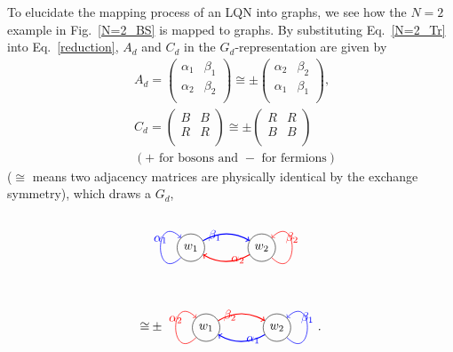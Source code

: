 \documentclass[a4paper,twocolumn,8pt,accepted=2021-12-15]{quantumarticle}
\newcommand{\nn}{\nonumber}
\def\a{\alpha}
\def\b{\beta}
\begin{document}
	To elucidate the mapping process of an LQN into graphs, we see how the $N=2$ example in Fig.~\ref{N=2_BS} is mapped to graphs. By substituting Eq.~\eqref{N=2_Tr} into Eq.~\eqref{reduction}, $A_{d}$ and $C_d$ in the $G_d$-representation are given by
	\begin{align}
		&A_d= \begin{pmatrix}
			\a_1 & \b_1 \\
			\a_2 & \b_{2} \\
		\end{pmatrix}\cong \pm \begin{pmatrix}
			\a_2 & \b_2\\
			\a_1 & \b_{1} \\
		\end{pmatrix}
		,\nn \\
		&C_d = 
		\begin{pmatrix}
			B & B \\
			R & R \\
		\end{pmatrix}
		\cong  \pm \begin{pmatrix}
			R & R \\
			B & B \\
		\end{pmatrix} \nn\\
		& (\textrm{$+$ for bosons and $-$ for fermions})
	\end{align} ($\cong$ means two adjacency matrices are physically identical by the exchange symmetry),    
	which draws a $G_d$,
	\begin{align}
		&\begin{tikzpicture}[baseline={([yshift=-.5ex]current bounding box.center)}]
			\node[circle,draw,minimum size=0.5cm] (XX) at (0,0) {$w_1$};
			\node[circle,draw,minimum size=0.5cm] (YY) at (2,0) {$w_2$};
			\path[every loop/.style={min distance=10mm,in=135,out=225,looseness=5},line width = 0.5pt,->,color=blue] (XX) edge [loop above] node {$\a_1$} (XX);
			\path[every loop/.style={min distance=10mm,in=45,out=-45,looseness=5},line width = 0.5pt,->,color=red] (YY) edge [loop above] node{$\b_2$} (YY);		
			\path[line width = 0.8pt, ->,color=blue] (XX) edge[bend left]   node[ near start] {$\b_1$ } (YY);
			\path[line width = 0.8pt,color=red, -> ] (YY) edge[bend left]  node[near start] {$\a_2$ } (XX);
		\end{tikzpicture}
		\nn \\
		\cong &\pm 
		\begin{tikzpicture}[baseline={([yshift=-.5ex]current bounding box.center)}]
			\node[circle,draw,minimum size=0.5cm] (XX) at (5.5,0) {$w_1$};
			\node[circle,draw,minimum size=0.5cm] (YY) at (7.5,0) {$w_2$};
			\path[every loop/.style={min distance=10mm,in=135,out=225,looseness=5},line width = 0.5pt,->,color=red] (XX) edge [loop above] node {$\a_2$} (XX);
			\path[every loop/.style={min distance=10mm,in=45,out=-45,looseness=5},line width = 0.5pt,->,color=blue] (YY) edge [loop above] node{$\b_1$} (YY);		
			\path[line width = 0.8pt, ->,color=red] (XX) edge[bend left]   node[ near start] {$\b_2$ } (YY);
			\path[line width = 0.8pt,color=blue, -> ] (YY) edge[bend left]  node[near start] {$\a_1$ } (XX);
		\end{tikzpicture}.
	\end{align}
\end{document}
